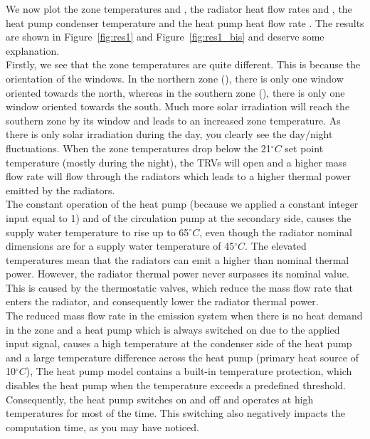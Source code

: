 \documentclass[10pt,a4paper]{article}
\begin{document}
We now plot the zone temperatures  and , the radiator heat flow rates  and , the heat pump condenser temperature  and the heat pump heat flow rate . The results are shown in Figure~\ref{fig:res1} and Figure~\ref{fig:res1_bis} and deserve some explanation.\\

Firstly, we see that the zone temperatures are quite different. This is because the orientation of the windows. In the northern zone (), there is only one window oriented towards the north, whereas in the southern zone (), there is only one window oriented towards the south. Much more solar irradiation will reach the southern zone by its window and leads to an increased zone temperature. As there is only solar irradiation during the day, you clearly see the day/night fluctuations. When the zone temperatures drop below the 21$^{\circ}C$ set point temperature (mostly during the night), the TRVs will open and a higher mass flow rate will flow through the radiators which leads to a higher thermal power emitted by the radiators.\\

The constant operation of the heat pump (because we applied a constant integer input equal to 1) and of the circulation pump at the secondary side, causes the supply water temperature to rise up to 65$^{\circ}C$, even though the radiator nominal dimensions are for a supply water temperature of
45$^{\circ}C$. The elevated temperatures mean that the radiators can
emit a higher than nominal thermal power.
However, the radiator thermal power never surpasses its nominal value.
This is caused by the thermostatic valves, which reduce the mass flow rate
that enters the radiator, and consequently lower the radiator thermal power. \\

The reduced mass flow rate in the emission system when there is no heat demand in the zone and a heat pump which is always switched on due to the applied input signal, causes a high temperature at the condenser side of the heat pump and a large temperature difference across the heat pump (primary heat source of 10$^{\circ}C$),
The heat pump model contains a built-in temperature protection, which disables
the heat pump when the temperature exceeds a predefined threshold.
Consequently, the heat pump switches on and off
and operates at high temperatures for most of the time.
This switching also negatively impacts the computation time, 
as you may have noticed.\\
\end{document}
